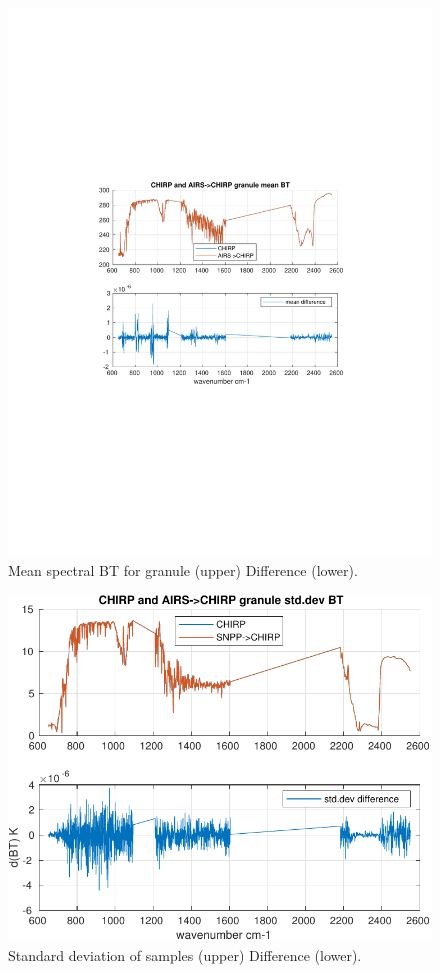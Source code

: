 \documentclass[11pt]{article}
\begin{document}
\begin{figure}[htbp]
\centering
\includegraphics[width=.9\linewidth]{./figs/2020d001g235_chirp_aq_bt_spectrum_mean.pdf}
\caption{\label{fig:orgcaeaa4c}
Mean spectral BT for granule (upper) Difference (lower).}
\end{figure}

\begin{figure}[htbp]
\centering
\includegraphics[width=.9\linewidth]{./figs/2020d001g235_chirp_aq_bt_spectrum_std.pdf}
\caption{\label{fig:orgb886f87}
Standard deviation of samples (upper) Difference (lower).}
\end{figure}
\end{document}

